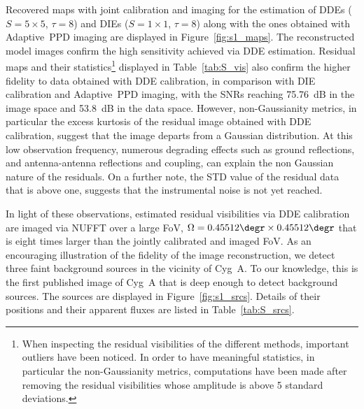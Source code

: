 \documentclass[fleqn,usenatbib]{mnras}
\begin{document}


Recovered maps with joint calibration and imaging for the estimation of DDEs ($S=5\times5$, $\tau=8$) and DIEs ($S=1\times 1$, $\tau=8$) along with the ones obtained with {Adaptive~PPD} imaging are displayed in Figure~\ref{fig:s1_maps}. The reconstructed model images confirm the high sensitivity achieved via DDE estimation. Residual maps and their statistics\footnote{When inspecting the residual visibilities of the different methods, important outliers have been noticed. In order to have meaningful statistics, in particular the non-Gaussianity metrics, computations have been made after removing the residual visibilities whose amplitude is above 5 standard deviations.} displayed in Table~\ref{tab:S_vis} also confirm the higher fidelity to data obtained with DDE calibration, in comparison with DIE calibration and {Adaptive~PPD} imaging, with the SNRs reaching 75.76~dB in the image space and 53.8~dB in the data space. However, non-Gaussianity metrics, in particular the excess kurtosis of the residual image obtained with DDE calibration, suggest that the image departs from a Gaussian distribution. {At this low observation frequency, numerous degrading effects such as ground reflections, and antenna-antenna reflections and coupling, can explain the non Gaussian nature of the residuals}. On a further note, the STD value of the residual data that is above one, suggests that the instrumental noise is not yet reached.

In light of these observations, estimated residual visibilities via DDE calibration are imaged via NUFFT over a large FoV, $\Omega =0.45512\degr \times 0.45512\degr$ that is eight times larger than the jointly calibrated and imaged FoV. As an encouraging illustration of the fidelity of the image reconstruction, we detect three faint background sources in the vicinity of Cyg~A. To our knowledge, this is the first published image of Cyg~A that is deep enough to detect background sources. The sources are displayed in Figure~\ref{fig:s1_srcs}. Details of their positions and their apparent fluxes are listed in Table~\ref{tab:S_srcs}.





\end{document}
